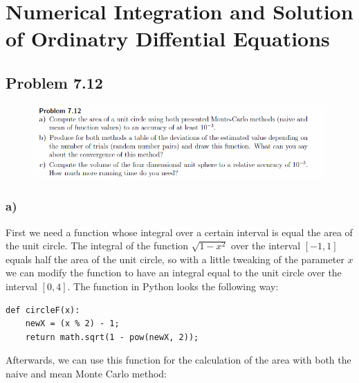 \section{Numerical Integration and Solution of Ordinatry Diffential Equations}


\subsection{Problem 7.12}


\begin{figure}[!ht]
\includegraphics[width=1\textwidth]{chapters/images/desc-7-12}
\end{figure}


\subsubsection{a)}

First we need a function whose integral over a certain interval is equal the area of the unit circle. The integral of the function $\sqrt{1 - x^2}$ over the interval $[-1, 1]$ equals half the area of the unit circle, so with a little tweaking of the parameter $x$ we can modify the function to have an integral equal to the unit circle over the interval $[0, 4]$. The function in Python looks the following way:

\begin{lstlisting}[caption=Function for the unit circle area]
def circleF(x):
	newX = (x % 2) - 1;
	return math.sqrt(1 - pow(newX, 2));
\end{lstlisting}

Afterwards, we can use this function for the calculation of the area with both the naive and mean Monte Carlo method:

